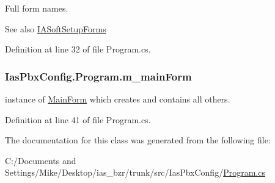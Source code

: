 Full form names. \begin{DoxySeeAlso}{See also}
\hyperlink{namespace_ias_pbx_config_a3304277b6c0e85a58951234034da7f3b}{IASoftSetupForms} 
\end{DoxySeeAlso}


Definition at line 32 of file Program.cs.\hypertarget{class_ias_pbx_config_1_1_program_a5963cd004a93c98ddceb23bb869a021f}{
\subsubsection[{m\_\-mainForm}]{ {\bf IasPbxConfig.Program.m\_\-mainForm}}}
\label{class_ias_pbx_config_1_1_program_a5963cd004a93c98ddceb23bb869a021f}


instance of \hyperlink{class_ias_pbx_config_1_1_main_form}{MainForm} which creates and contains all others. 

Definition at line 41 of file Program.cs.

The documentation for this class was generated from the following file:\begin{DoxyCompactItemize}
\item 
C:/Documents and Settings/Mike/Desktop/ias\_\-bzr/trunk/src/IasPbxConfig/\hyperlink{_program_8cs}{Program.cs}\end{DoxyCompactItemize}

